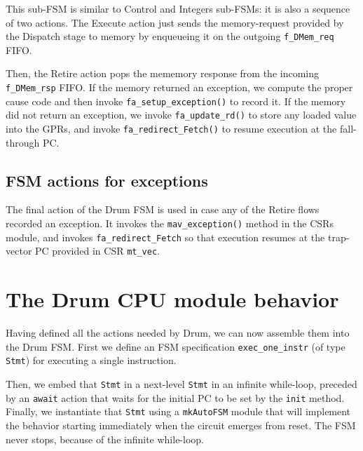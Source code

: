 This sub-FSM is similar to Control and Integers sub-FSMs: it is also a
sequence of two actions.  The Execute action just sends the
memory-request provided by the Dispatch stage to memory by enqueueing
it on the outgoing \verb|f_DMem_req| FIFO.



Then, the Retire action pops the mememory response from the incoming
\verb|f_DMem_rsp| FIFO.  If the memory returned an exception, we
compute the proper cause code and then invoke
\verb|fa_setup_exception()| to record it.  If the memory did not
return an exception, we invoke \verb|fa_update_rd()| to store any
loaded value into the GPRs, and invoke \verb|fa_redirect_Fetch()| to
resume execution at the fall-through PC.




\subsection{FSM actions for exceptions}

The final action of the Drum FSM is used in case any of the Retire
flows recorded an exception.  It invokes the \verb|mav_exception()|
method in the CSRs module, and invokes \verb|fa_redirect_Fetch| so
that execution resumes at the trap-vector PC provided in CSR
\verb|mt_vec|.




\section{The Drum CPU module behavior}

\label{Sec_Drum_CPU_module_behavior}


Having defined all the actions needed by Drum, we can now assemble
them into the Drum FSM.  First we define an FSM specification
\verb|exec_one_instr| (of type \verb|Stmt|) for executing a single
instruction.

Then, we embed that \verb|Stmt| in a next-level
\verb|Stmt| in an infinite while-loop, preceded by an \verb|await|
action that waits for the initial PC to be set by the \verb|init|
method. Finally, we instantiate that \verb|Stmt| using a
\verb|mkAutoFSM| module that will implement the behavior starting
immediately when the circuit emerges from reset.  The FSM never stops,
because of the infinite while-loop.

